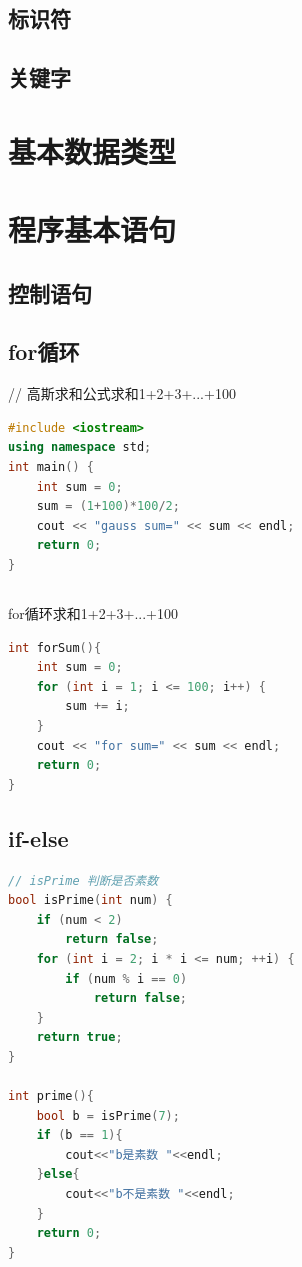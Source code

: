 \documentclass[12pt,twiside,a4paper]{ctexbook}
\numberwithin{chapter}{part}
\begin{document}
\section{标识符}

\section{关键字}

\chapter{基本数据类型}

\chapter{程序基本语句}
\section{控制语句}
\section{for循环}
// 高斯求和公式求和1+2+3+...+100
\begin{lstlisting}[language=C++]
#include <iostream>
using namespace std;
int main() {
    int sum = 0;
    sum = (1+100)*100/2;
    cout << "gauss sum=" << sum << endl;
    return 0;
}
\end{lstlisting}

\section{}
for循环求和1+2+3+...+100\\
\begin{lstlisting}[language=C++]
int forSum(){
    int sum = 0;
    for (int i = 1; i <= 100; i++) {
        sum += i;
    }
    cout << "for sum=" << sum << endl;
    return 0;
}
\end{lstlisting}

\section{if-else}
\begin{lstlisting}[language=C++]
// isPrime 判断是否素数
bool isPrime(int num) {
    if (num < 2)
        return false;
    for (int i = 2; i * i <= num; ++i) {
        if (num % i == 0)
            return false;
    }
    return true;
}

int prime(){
	bool b = isPrime(7);
	if (b == 1){
		cout<<"b是素数 "<<endl;
	}else{
		cout<<"b不是素数 "<<endl;
	}
	return 0;
}
\end{lstlisting}
\end{document}
